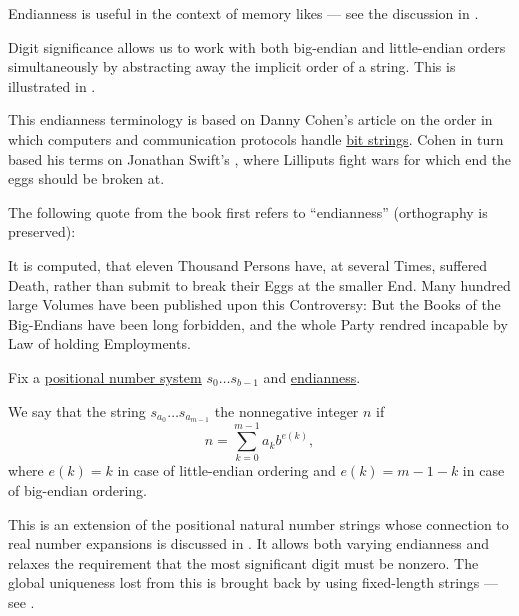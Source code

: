 \begin{comments}
  \item Endianness is useful in the context of memory likes --- see the discussion in .

  \item Digit significance allows us to work with both big-endian and little-endian orders simultaneously by abstracting away the implicit order of a string. This is illustrated in .

  \item This endianness terminology is based on Danny Cohen's article \cite{Cohen1981Endianness} on the order in which computers and communication protocols handle \hyperref[def:bit_string]{bit strings}. Cohen in turn based his terms on Jonathan Swift's \cite{Swift2005GulliverTravels}, where Lilliputs fight wars for which end the eggs should be broken at.

  The following quote from the book first refers to \enquote{endianness} (orthography is preserved):
  \begin{displayquote}
    It is computed, that eleven Thousand Persons have, at several Times, suffered Death, rather than submit to break their Eggs at the smaller End. Many hundred large Volumes have been published upon this Controversy: But the Books of the Big-Endians have been long forbidden, and the whole Party rendred incapable by Law of holding Employments.
  \end{displayquote}
\end{comments}

\begin{definition}\label{def:fixed_length_nonnegative_integer_encoding}\mimprovised
  Fix a \hyperref[def:positional_number_system]{positional number system} \( s_0 \ldots s_{b-1} \) and \hyperref[def:endianness]{endianness}.

  We say that the string \( s_{a_0} \ldots s_{a_{m-1}} \)  the nonnegative integer \( n \) if
  \begin{equation*}
    n = \sum_{k=0}^{m-1} a_k b^{e(k)},
  \end{equation*}
  where \( e(k) = k \) in case of little-endian ordering and \( e(k) = m - 1 - k \) in case of big-endian ordering.
\end{definition}
\begin{comments}
  \item This is an extension of the positional natural number strings whose connection to real number expansions is discussed in . It allows both varying endianness and relaxes the requirement that the most significant digit must be nonzero. The global uniqueness lost from this is brought back by using fixed-length strings --- see .
\end{comments}

